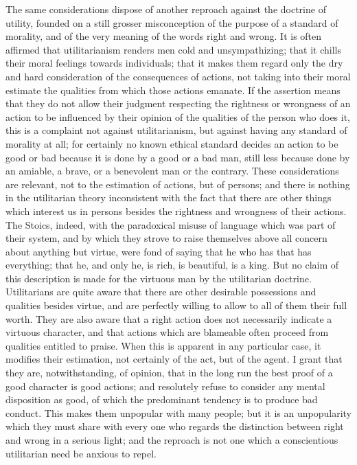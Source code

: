 \documentclass[12pt]{report}
\begin{document}
The same considerations dispose of another reproach against the doctrine of utility, founded on a still grosser misconception of the purpose of a standard of morality, and of the very meaning of the words right and wrong. It is often affirmed that utilitarianism renders men cold and unsympathizing; that it chills their moral feelings towards individuals; that it makes them regard only the dry and hard consideration of the consequences of actions, not taking into their moral estimate the qualities from which those actions emanate. If the assertion means that they do not allow their judgment respecting the rightness or wrongness of an action to be influenced by their opinion of the qualities of the person who does it, this is a complaint not against utilitarianism, but against having any standard of morality at all; for certainly no known ethical standard decides an action to be good or bad because it is done by a good or a bad man, still less because done by an amiable, a brave, or a benevolent man or the contrary. These considerations are relevant, not to the estimation of actions, but of persons; and there is nothing in the utilitarian theory inconsistent with the fact that there are other things which interest us in persons besides the rightness and wrongness of their actions. The Stoics, indeed, with the paradoxical misuse of language which was part of their system, and by which they strove to raise themselves above all concern about anything but virtue, were fond of saying that he who has that has everything; that he, and only he, is rich, is beautiful, is a king. But no claim of this description is made for the virtuous man by the utilitarian doctrine. Utilitarians are quite aware that there are other desirable possessions and qualities besides virtue, and are perfectly willing to allow to all of them their full worth. They are also aware that a right action does not necessarily indicate a virtuous character, and that actions which are blameable often proceed from qualities entitled to praise. When this is apparent in any particular case, it modifies their estimation, not certainly of the act, but of the agent. I grant that they are, notwithstanding, of opinion, that in the long run the best proof of a good character is good actions; and resolutely refuse to consider any mental disposition as good, of which the predominant tendency is to produce bad conduct. This makes them unpopular with many people; but it is an unpopularity which they must share with every one who regards the distinction between right and wrong in a serious light; and the reproach is not one which a conscientious utilitarian need be anxious to repel.
\end{document}

